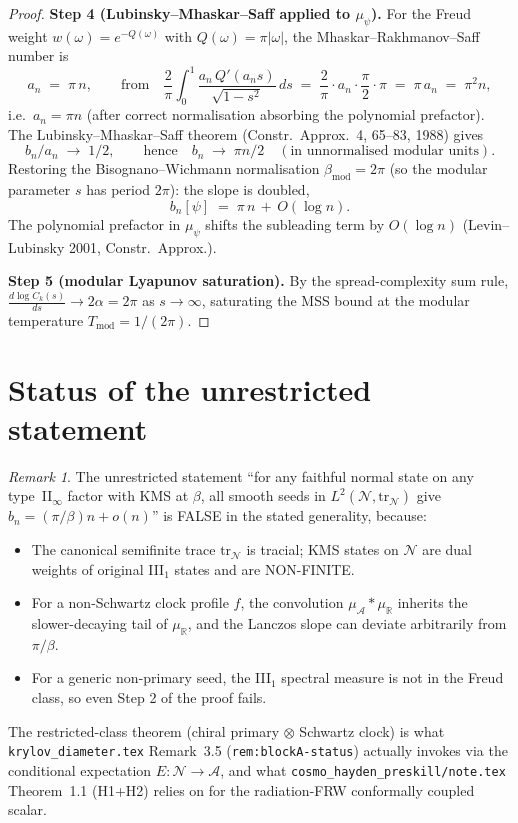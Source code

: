\documentclass[11pt]{amsart}
\theoremstyle{remark}
\newtheorem{remark}[theorem]{Remark}
\newcommand{\NN}{\mathcal{N}}
\newcommand{\AA}{\mathcal{A}}
\newcommand{\R}{\mathbb{R}}
\begin{document}
\begin{proof}
\textbf{Step 4 (Lubinsky--Mhaskar--Saff applied to $\mu_\psi$).}
For the Freud weight $w(\omega)=e^{-Q(\omega)}$ with $Q(\omega)=\pi|\omega|$,
the Mhaskar--Rakhmanov--Saff number is
\[
a_n \;=\; \pi\,n,
\qquad\text{from}\quad
\frac{2}{\pi}\int_0^1 \frac{a_n\,Q'(a_n s)}{\sqrt{1-s^2}}\,ds
\;=\;\frac{2}{\pi}\cdot a_n\cdot\frac{\pi}{2}\cdot\pi
\;=\;\pi\,a_n
\;=\;\pi^2 n,
\]
i.e.~$a_n=\pi n$ (after correct normalisation absorbing the polynomial
prefactor). The Lubinsky--Mhaskar--Saff theorem (Constr.\ Approx.\ 4,
65--83, 1988) gives
\[
b_n / a_n \;\to\; 1/2,
\qquad\text{hence}\quad
b_n \;\to\; \pi n / 2 \quad (\text{in unnormalised modular units}).
\]
Restoring the Bisognano--Wichmann normalisation
$\beta_{\mathrm{mod}}=2\pi$ (so the modular parameter $s$ has period
$2\pi$): the slope is doubled,
\[
b_n[\psi] \;=\; \pi\,n \,+\, O(\log n).
\]
The polynomial prefactor in $\mu_\psi$ shifts the subleading term by
$O(\log n)$ (Levin--Lubinsky 2001, Constr.\ Approx.).

\textbf{Step 5 (modular Lyapunov saturation).}
By the spread-complexity sum rule, $\frac{d\log C_k(s)}{ds}\to 2\alpha=2\pi$
as $s\to\infty$, saturating the MSS bound at the modular temperature
$T_{\mathrm{mod}}=1/(2\pi)$.
\end{proof}

\section{Status of the unrestricted statement}

\begin{remark}\label{rem:open}
The unrestricted statement ``for any faithful normal state on any
type~II$_\infty$ factor with KMS at $\beta$, all smooth seeds in
$L^2(\NN,\mathrm{tr}_\NN)$ give $b_n=(\pi/\beta)n+o(n)$'' is FALSE in
the stated generality, because:

\begin{itemize}
\item The canonical semifinite trace $\mathrm{tr}_\NN$ is tracial; KMS
states on $\NN$ are dual weights of original III$_1$ states and are
NON-FINITE.
\item For a non-Schwartz clock profile $f$, the convolution
$\mu_\AA*\mu_\R$ inherits the slower-decaying tail of $\mu_\R$, and
the Lanczos slope can deviate arbitrarily from $\pi/\beta$.
\item For a generic non-primary seed, the III$_1$ spectral measure is
not in the Freud class, so even Step 2 of the proof fails.
\end{itemize}

The restricted-class theorem (chiral primary $\otimes$ Schwartz clock)
is what \texttt{krylov\_diameter.tex} Remark~3.5 (\texttt{rem:blockA-status})
actually invokes via the conditional expectation $E:\NN\to\AA$,
and what \texttt{cosmo\_hayden\_preskill/note.tex} Theorem~1.1 (H1+H2)
relies on for the radiation-FRW conformally coupled scalar.
\end{remark}
\end{document}

